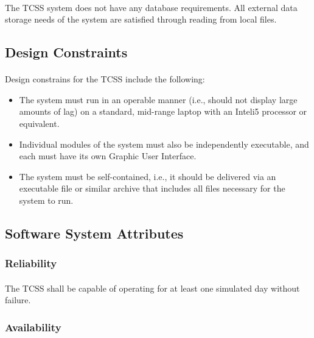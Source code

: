\documentclass{article}
\begin{document}
    \paragraph{}
    The TCSS system does not have any database requirements. All external data storage needs of the system are satisfied through reading from local files.
    
    \subsection{Design Constraints}
    \label{designconstraints}
    \paragraph{}
    Design constrains for the TCSS include the following:
    \begin{itemize}
        \item The system must run in an operable manner (i.e., should not display large amounts of lag) on a standard, mid-range laptop with an Intel\textregistered \:i5 processor or equivalent. 
        \item Individual modules of the system must also be independently executable, and each must have its own Graphic User Interface.
        \item The system must be self-contained, i.e., it should be delivered via an executable file or similar archive that includes all files necessary for the system to run.
    \end{itemize}
    
    \subsection{Software System Attributes}
   
    \subsubsection{Reliability}
    \paragraph{}
    The TCSS shall be capable of operating for at least one simulated day without failure.

    \subsubsection{Availability}
\end{document}
